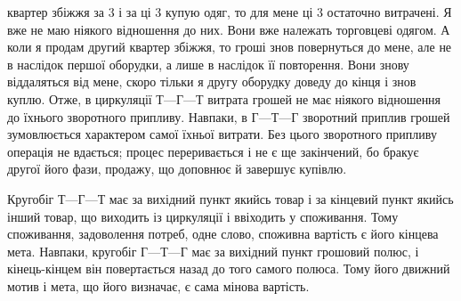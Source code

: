 \parcont{}  %
квартер збіжжя за 3 і за ці 3
купую одяг, то для мене ці 3 остаточно витрачені.
Я вже не маю ніякого відношення до них. Вони вже належать
торговцеві одягом. А коли я продам другий квартер збіжжя,
то гроші знов повернуться до мене, але не в наслідок першої
оборудки, а лише в наслідок її повторення. Вони знову віддаляться
від мене, скоро тільки я другу оборудку доведу до кінця
і знов куплю. Отже, в циркуляції $Т — Г — Т$ витрата грошей
не має ніякого відношення до їхнього зворотного припливу. Навпаки,
в $Г — Т — Г$ зворотний приплив грошей зумовлюється
характером самої їхньої витрати. Без цього зворотного припливу
операція не вдається; процес переривається і не є ще закінчений,
бо бракує другої його фази, продажу, що доповнює й завершує
купівлю.

Кругобіг $Т — Г — Т$ має за вихідний пункт якийсь товар і
за кінцевий пункт якийсь інший товар, що виходить із циркуляції
і ввіходить у споживання. Тому споживання, задоволення
потреб, одне слово, споживна вартість є його кінцева мета.
Навпаки, кругобіг $Г — Т — Г$ має за вихідний пункт грошовий
полюс, і кінець-кінцем він повертається назад до того самого
полюса. Тому його движний мотив і мета, що його визначає, є
сама мінова вартість.

